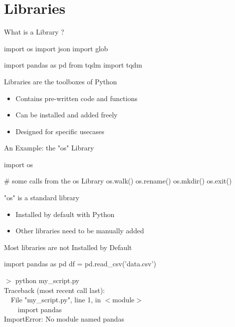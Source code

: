 \documentclass[serif, aspectratio=169]{beamer}
\begin{document}
\section{Libraries}

\begin{frame}[fragile]{What is a Library ?}
    \begin{pythoncode}
    import os
    import json
    import glob
    
    import pandas as pd
    from tqdm import tqdm
    \end{pythoncode}
    \vfill
    \begin{block}{Libraries are the toolboxes of Python}
        \begin{itemize}
            \item Contains pre-written code and functions
            \item Can be installed and added freely
            \item Designed for specific usecases
        \end{itemize}
    \end{block}
\end{frame}

\begin{frame}[fragile]{An Example: the "os" Library}
    \begin{pythoncode}
    import os
    
    # some calls from the os Library
    os.walk()
    os.rename()
    os.mkdir()
    os.exit()
    \end{pythoncode}
    \vfill
    \begin{block}{"os" is a standard library}
        \begin{itemize}
            \item Installed by default with Python
            \item Other libraries need to be manually added
        \end{itemize}
    \end{block}
\end{frame}

\begin{frame}[fragile]{Most libraries are not Installed by Default}
    \begin{pythoncode}
    import pandas as pd
    df = pd.read_csv('data.csv')
    \end{pythoncode}
    \vfill
    \begin{CLI}
        $>$ python my\_script.py \\
        Traceback (most recent call last): \\
        ~~File "my\_script.py", line 1, in $<$module$>$ \\
        ~~~~import pandas \\
        ImportError: No module named pandas \\
    \end{CLI}
\end{frame}
\end{document}
